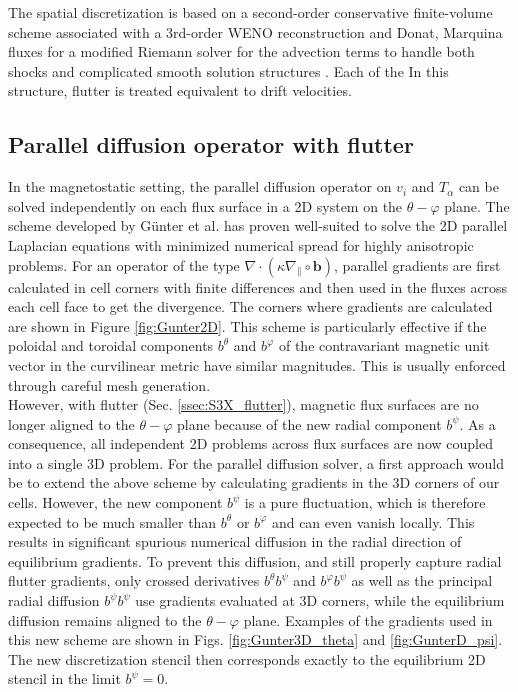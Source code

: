 The spatial discretization is based on a second-order conservative finite-volume scheme associated with a 3rd-order WENO reconstruction and Donat, Marquina fluxes for a modified Riemann solver for the advection terms to handle both shocks and complicated smooth solution structures \cite{tamain2016tokam3x, Bufferand2021}. \newline
Each of the In this structure, flutter is treated equivalent to drift velocities. 



\subsection{Parallel diffusion operator with flutter}
\label{ssec:impl_3DGunter}

In the magnetostatic setting, the parallel diffusion operator on $v_i$ and $T_\alpha$ can be solved independently on each flux surface in a 2D system on the $\theta - \varphi$ plane. The scheme developed by Günter et al. \cite{gunter2005} has proven well-suited to solve the 2D parallel Laplacian equations with minimized numerical spread for highly anisotropic problems. For an operator of the type $\nabla \cdot (\kappa \nabla_\parallel \circ \mathbf{b} )$, parallel gradients are first calculated in cell corners with finite differences and then used in the fluxes across each cell face to get the divergence. The corners where gradients are calculated are shown in Figure \ref{fig:Gunter2D}. This scheme is particularly effective if the poloidal and toroidal components $b^\theta$ and $b^\varphi$ of the contravariant magnetic unit vector in the curvilinear metric have similar magnitudes. This is usually enforced through careful mesh generation. \\

However, with flutter (Sec. \ref{ssec:S3X_flutter}), magnetic flux surfaces are no longer aligned to the $\theta - \varphi$ plane because of the new radial component $b^\psi$. As a consequence, all independent 2D problems across flux surfaces are now coupled into a single 3D problem. For the parallel diffusion solver, a first approach would be to extend the above scheme by calculating gradients in the 3D corners of our cells. However, the new component $b^\psi$ is a pure fluctuation, which is therefore expected to be much smaller than $b^\theta$ or $b^\varphi$ and can even vanish locally. This results in significant spurious numerical diffusion in the radial direction of equilibrium gradients. To prevent this diffusion, and still properly capture radial flutter gradients, only crossed derivatives $b^\theta b^\psi$ and $b^\varphi b^\psi$ as well as the principal radial diffusion $b^\psi b^\psi$ use gradients evaluated at 3D corners, while the equilibrium diffusion remains aligned to the $\theta - \varphi$ plane. Examples of the gradients used in this new scheme are shown in Figs. \ref{fig:Gunter3D_theta} and \ref{fig:GunterD_psi}. The new discretization stencil then corresponds exactly to the equilibrium 2D stencil in the limit $b^\psi=0$. \newline

